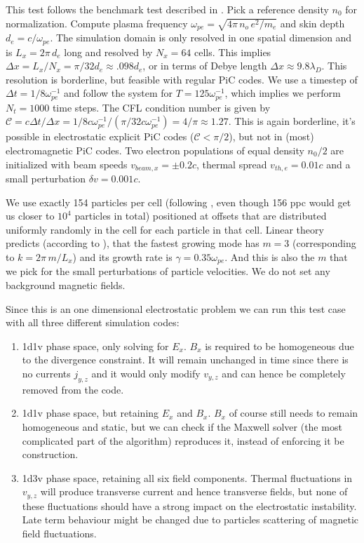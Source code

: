 \documentclass[%
preprint,
amsmath,amssymb,
aps,
]{revtex4-2}
\begin{document}
This test follows the benchmark test described in \cite[section
4.1]{LAPENTA2017349}.  Pick a reference density $n_0$ for normalization.
Compute plasma frequency $\omega_{pe} = \sqrt{4\pi\,n_o\,e^2/m_e}$ and skin
depth $d_e = c/\omega_{pe}$. The simulation domain is only resolved in one
spatial dimension and is $L_x = 2\pi\,d_e$ long and resolved by $N_x = 64$
cells. This implies $\Delta{x} = L_x/ N_x = \pi/32 d_e \approx .098 d_e$, or in
terms of Debye length $\Delta{x} \approx 9.8 \lambda_D$. This resolution is
borderline, but feasible with regular PiC codes.  We use a timestep of
$\Delta{t} = 1/8 \omega_{pe}^{-1}$ and follow the system for $T = 125
\omega_{pe}^{-1}$, which implies we perform $N_t = 1000$ time steps. The CFL
condition number is given by $\mathcal{C} = c \Delta{t}/\Delta{x} = 1/8 c
\omega_{pe}^{-1} / (\pi/32 c \omega_{pe}^{-1}) = 4/\pi \approx 1.27$. This is
again borderline, it's possible in electrostatic explicit PiC codes
($\mathcal{C} < \pi/2$), but not in (most) electromagnetic PiC codes.  Two
electron populations of equal density $n_0/2$ are initialized with beam speeds
$v_{beam,x} = \pm 0.2 c$, thermal spread $v_{th,e} = 0.01 c$ and a small
perturbation $\delta{v} = 0.001 c$.

We use exactly 154 particles per cell (following \cite{LAPENTA2017349}, even
though 156 ppc would get us closer to $10^4$ particles in total) positioned at
offsets that are distributed uniformly randomly in the cell for each particle
in that cell.  Linear theory predicts (according to \cite{LAPENTA2017349}),
that the fastest growing mode has $m = 3$ (corresponding to $k = 2\pi\,m/L_x$)
and its growth rate is $\gamma = 0.35 \omega_{pe}$. And this is also the $m$
that we pick for the small perturbations of particle velocities.  We do not set
any background magnetic fields.

Since this is an one dimensional electrostatic problem we can run this test
case with all three different simulation codes:
\begin{enumerate}
    \item 1d1v phase space, only solving for $E_x$. $B_x$ is required to be
    homogeneous due to the divergence constraint. It will remain unchanged in
    time since there is no currents $j_{y,z}$ and it would only modify
    $v_{y,z}$ and can hence be completely removed from the code.
    \item 1d1v phase space, but retaining $E_x$ and $B_x$. $B_x$ of course
    still needs to remain homogeneous and static, but we can check if the
    Maxwell solver (the most complicated part of the algorithm) reproduces it,
    instead of enforcing it be construction.
    \item 1d3v phase space, retaining all six field components. Thermal
    fluctuations in $v_{y,z}$ will produce transverse current and hence
    transverse fields, but none of these fluctuations should have a strong
    impact on the electrostatic instability. Late term behaviour might be
    changed due to particles scattering of magnetic field fluctuations.
\end{enumerate}
\end{document}
